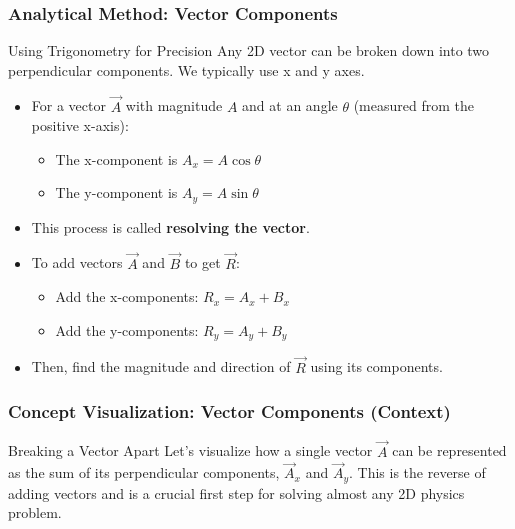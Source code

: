 \documentclass{beamer}
\begin{document}
\begin{frame}
\frametitle{Analytical Method: Vector Components}
\begin{block}{Using Trigonometry for Precision}
Any 2D vector can be broken down into two perpendicular components. We typically use x and y axes.
\end{block}
\begin{itemize}
    \item For a vector $\vec{A}$ with magnitude $A$ and at an angle $\theta$ (measured from the positive x-axis):
    \begin{itemize}
        \item The x-component is $A_x = A \cos \theta$
        \item The y-component is $A_y = A \sin \theta$
    \end{itemize}
    \item This process is called \textbf{resolving the vector}.
    \item To add vectors $\vec{A}$ and $\vec{B}$ to get $\vec{R}$:
    \begin{itemize}
        \item Add the x-components: $R_x = A_x + B_x$
        \item Add the y-components: $R_y = A_y + B_y$
    \end{itemize}
    \item Then, find the magnitude and direction of $\vec{R}$ using its components.
\end{itemize}
\end{frame}

\begin{frame}
\frametitle{Concept Visualization: Vector Components (Context)}
\begin{block}{Breaking a Vector Apart}
Let's visualize how a single vector $\vec{A}$ can be represented as the sum of its perpendicular components, $\vec{A}_x$ and $\vec{A}_y$.
\vfill
This is the reverse of adding vectors and is a crucial first step for solving almost any 2D physics problem.
\end{block}
\end{frame}
\end{document}
